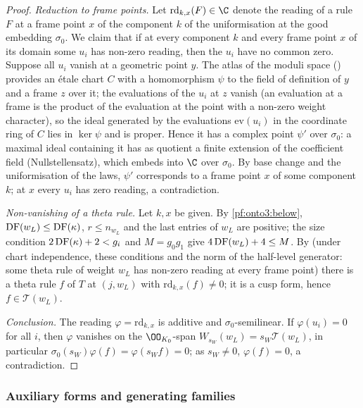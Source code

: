 \begin{proof}
\emph{Reduction to frame points.} Let $\mathrm{rd}_{k,x}(F)\in\C$ denote the reading of a rule $F$ at a frame point $x$ of
the component $k$ of the uniformisation at the good embedding $\sigma_0$. We claim that if at every component $k$ and every
frame point $x$ of its domain some $u_i$ has non-zero reading, then the $u_i$ have no common zero. Suppose all $u_i$
vanish at a geometric point $y$. The atlas of the moduli space () provides an
\'etale chart $C$ with a homomorphism $\psi$ to the field of definition of $y$ and a frame $z$ over it; the evaluations
of the $u_i$ at $z$ vanish (an evaluation at a frame is the product of the evaluation at the point with a non-zero
weight character), so the ideal generated by the evaluations $\mathrm{ev}(u_i)$ in the coordinate ring of $C$ lies in
$\ker\psi$ and is proper. Hence it has a complex point $\psi'$ over $\sigma_0$: a maximal ideal containing it has as
quotient a finite extension of the coefficient field (Nullstellensatz), which embeds into $\C$ over $\sigma_0$. By base
change and the uniformisation of the laws, $\psi'$
corresponds to a frame point $x$ of some component $k$; at $x$ every $u_i$ has zero reading, a contradiction.

\emph{Non-vanishing of a theta rule.} Let $k,x$ be given. By \cref{pf:onto3:below}, $\operatorname{DF}(w_L)\le\operatorname{DF}(\kappa)$,
$r\le n_{w_L}$ and the last entries of $w_L$ are positive; the size condition $2\operatorname{DF}(\kappa)+2<g_i$ and $M=g_0g_1$
give $4\operatorname{DF}(w_L)+4\le M$. By  (under chart independence, these
conditions and the norm of the half-level generator: some theta rule of weight $w_L$ has non-zero reading at every frame
point) there is a theta rule $f$ of $T$ at $(j,w_L)$ with $\mathrm{rd}_{k,x}(f)\ne0$; it is a cusp form, hence $f\in
\mathcal T(w_L)$.

\emph{Conclusion.} The reading $\varphi=\mathrm{rd}_{k,x}$ is additive and $\sigma_0$-semilinear. If $\varphi(u_i)=0$ for all
$i$, then $\varphi$ vanishes on the $\OO_{K_0}$-span $W_{s_W}(w_L)=s_W\mathcal T(w_L)$, in particular $\sigma_0(s_W)\varphi(f)=
\varphi(s_Wf)=0$; as $s_W\ne0$, $\varphi(f)=0$, a contradiction.
\end{proof}

\subsubsection{Auxiliary forms and generating families}

